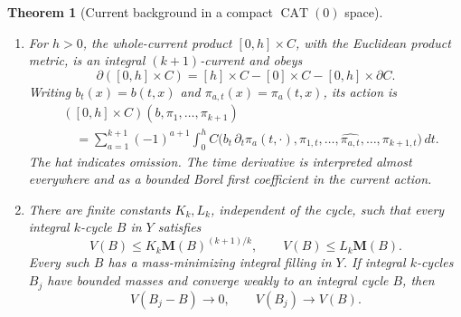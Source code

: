 \documentclass[11pt]{article}
\numberwithin{equation}{section}
\newtheorem{theorem}{Theorem}[section]
\theoremstyle{definition}
\theoremstyle{remark}
\begin{document}
\begin{theorem}[Current background in a compact \(\operatorname{CAT}(0)\) space]
\begin{enumerate}[label=\textup{(\roman*)}]
\item For \(h>0\), the whole-current product \([0,h]\times C\), with
the Euclidean product metric, is an integral \((k+1)\)-current and obeys
\begin{equation}
\label{eq:interval-product-boundary}
 \partial([0,h]\times C)
 =[h]\times C-[0]\times C-[0,h]\times\partial C.
\end{equation}
Writing \(b_t(x)=b(t,x)\) and \(\pi_{a,t}(x)=\pi_a(t,x)\), its action is
\begin{equation}
\label{eq:interval-product-action}
\begin{split}
 &([0,h]\times C)(b,\pi_1,\ldots,\pi_{k+1})\\
 &\quad=\sum_{a=1}^{k+1}(-1)^{a+1}\int_0^h
 C\bigl(b_t\,\partial_t\pi_a(t,\cdot),
          \pi_{1,t},\ldots,\widehat{\pi_{a,t}},\ldots,
          \pi_{k+1,t}\bigr)\,d t.
\end{split}
\end{equation}
The hat indicates omission. The time derivative is interpreted almost
everywhere and as a bounded Borel first coefficient in the current action.

\item There are finite constants \(K_k,L_k\), independent of the cycle,
such that every integral \(k\)-cycle \(B\) in \(Y\) satisfies
\begin{equation}
\label{eq:coarse-fillings}
 V(B)\le K_k\mathbf M(B)^{(k+1)/k},\qquad
 V(B)\le L_k\mathbf M(B).
\end{equation}
Every such \(B\) has a mass-minimizing integral filling in \(Y\).
If integral \(k\)-cycles \(B_j\) have bounded masses and converge weakly
to an integral cycle \(B\), then
\begin{equation}
\label{eq:filling-continuity}
 V(B_j-B)\longrightarrow0,
 \qquad V(B_j)\longrightarrow V(B).
\end{equation}
\end{enumerate}
\end{theorem}
\end{document}
